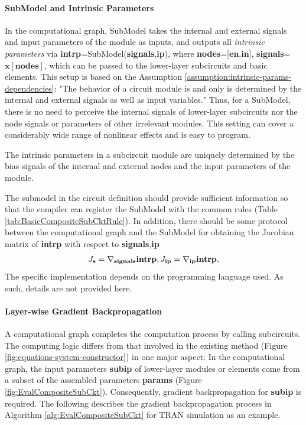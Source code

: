 \paragraph{SubModel and Intrinsic Parameters}
In the computational graph, SubModel takes the internal and external signals and input parameters of the module as inputs, and outputs all \textit{intrinsic parameters} via \textbf{intrp}=SubModel(\textbf{signals},\textbf{ip}), where \textbf{nodes}=[\textbf{en},\textbf{in}], \textbf{signals}=$\bm{x}[\textbf{nodes}]$,
which can be passed to the lower-layer subcircuits and basic elements.
This setup is based on the Assumption \ref{assumption:intrinsic-params-dependencies}: "The behavior of a circuit module is and only is determined by the internal and external signals as well as input variables." Thus, for a SubModel, there is no need to perceive the internal signals of lower-layer subcircuits nor the node signals or parameters of other irrelevant modules. This setting can cover a considerably wide range of nonlinear effects and is easy to program.
\begin{assumption}\label{assumption:intrinsic-params-dependencies}
The intrinsic parameters in a subcircuit module are uniquely determined by the bias signals of the internal and external nodes and the input parameters of the module.
\end{assumption}
The submodel in the circuit definition should provide sufficient information so that the compiler can register the SubModel with the common rules (Table \ref{tab:BasicCompositeSubCktRule}).
In addition, there should be some protocol between the computational graph and the SubModel for obtaining the Jacobian matrix of \textbf{intrp} with respect to \textbf{signals},\textbf{ip}
\vspace{-0.5em}
\begin{equation}\label{eq:submodel-jacobian}
J_{\textbf{s}} = \nabla_{\textbf{signals}}\textbf{intrp},
J_{\textbf{ip}}=\nabla_{\textbf{ip}}\textbf{intrp},
\vspace{-0.5em}
\end{equation}
The specific implementation depends on the programming language used. As such, details are not provided here.

\paragraph{Layer-wise Gradient Backpropagation}
A computational graph completes the computation process by calling subcircuits. The computing logic differs from that involved in the existing method (Figure \ref{fig:equations-system-constructor}) in one major aspect: In the computational graph, the input parameters \textbf{subip} of lower-layer modules or elements come from a subset of the assembled parameters \textbf{params} (Figure \ref{fig:EvalCompositeSubCkt}). Consequently, gradient backpropagation for \textbf{subip} is required. The following describes the gradient backpropagation process in Algorithm \ref{alg:EvalCompositeSubCkt} for TRAN simulation as an example.

